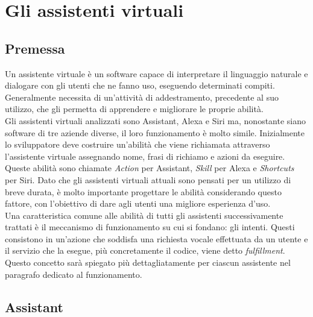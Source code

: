 
\chapter{Gli assistenti virtuali}
\label{cap:descrizione-stage}


\section{Premessa}
Un assistente virtuale è un software capace di interpretare il linguaggio naturale e dialogare con gli utenti che ne fanno uso, eseguendo determinati compiti. Generalmente necessita di un'attività di addestramento, precedente al suo utilizzo, che gli permetta di apprendere e migliorare le proprie abilità. \\
Gli assistenti virtuali analizzati sono Assistant, Alexa e Siri ma, nonostante siano software di tre aziende diverse, il loro funzionamento è molto simile. Inizialmente lo sviluppatore deve costruire un'abilità che viene richiamata attraverso l'assistente virtuale assegnando nome, frasi di richiamo e azioni da eseguire. Queste abilità sono chiamate \textit{Action} per Assistant, \textit{Skill} per Alexa e \textit{Shortcuts} per Siri. Dato che gli assistenti virtuali attuali sono pensati per un utilizzo di breve durata, è molto importante progettare le abilità considerando questo fattore, con l'obiettivo di dare agli utenti una migliore esperienza d'uso. \\
Una caratteristica comune alle abilità di tutti gli assistenti successivamente trattati è il meccanismo di funzionamento su cui si fondano: gli intenti. Questi consistono in un'azione che soddisfa una richiesta vocale effettuata da un utente e il servizio che la esegue, più concretamente il codice, viene detto \textit{fulfillment}. Questo concetto sarà spiegato più dettagliatamente per ciascun assistente nel paragrafo dedicato al funzionamento.

\section{Assistant}
